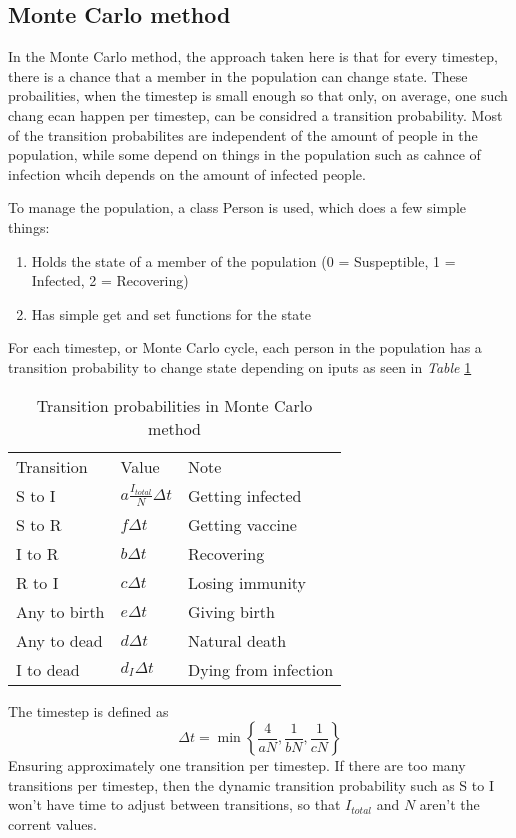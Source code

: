 \subsection{Monte Carlo method}
In the Monte Carlo method, the approach taken here is that for every timestep, there is a chance that a member in the population can change state.
These probailities, when the timestep is small enough so that only, on average, one such chang ecan happen per timestep, can be considred a transition probability.
Most of the transition probabilites are independent of the amount of people in the population, while some depend on things in the population such as cahnce of infection whcih depends on the amount of infected people.


To manage the population, a class Person is used, which does a few simple things:
\begin{enumerate}
    \item Holds the state of a member of the population (0 = Suspeptible, 1 = Infected, 2 = Recovering)
    \item Has simple get and set functions for the state
\end{enumerate}

For each timestep, or Monte Carlo cycle, each person in the population has a transition probability to change state depending on iputs as seen in \textit{Table} \ref{tab:transitions}

\begin{table}[!h]
    \centering
    \begin{tabular}{lll}
    Transition   & Value          & Note                       \\
    S to I       & $a\frac{I_{total}}{N}\Delta t$ & Getting infected           \\
    S to R       & $f \Delta t$           & Getting vaccine            \\
    I to R       & $b \Delta t$           & Recovering                 \\
    R to I       & $c \Delta t$           & Losing immunity            \\
    Any to birth & $e \Delta t$           & Giving birth               \\
    Any to dead  & $d \Delta t$           & Natural death              \\
    I to dead    & $d_I \Delta t$          & Dying from infection
    \end{tabular}
    \caption{Transition probabilities in Monte Carlo method}
    \label{tab:transitions}
    \end{table}

The timestep is defined as 
$$
\Delta t=\min \left\{\frac{4}{a N}, \frac{1}{b N}, \frac{1}{c N}\right\}
$$
Ensuring approximately one transition per timestep. 
If there are too many transitions per timestep, then the dynamic transition probability such as S to I won't have time to adjust between transitions, so that $I_{total}$ and $N$ aren't the corrent values.




